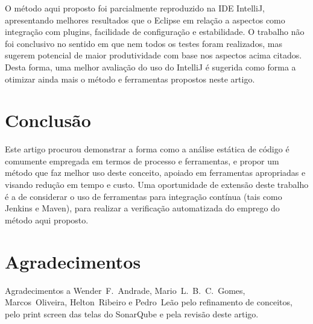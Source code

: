\documentclass[12pt,journal,compsoc]{IEEEtran}
\begin{document}
O método aqui proposto foi parcialmente reproduzido na IDE IntelliJ, apresentando melhores resultados que o Eclipse em relação a aspectos como integração com plugins, facilidade de configuração e estabilidade. O trabalho não foi conclusivo no sentido em que nem todos os testes foram realizados, mas sugerem potencial de maior produtividade com base nos aspectos acima citados. Desta forma, uma melhor avaliação do uso do IntelliJ é sugerida como forma a otimizar ainda mais o método e ferramentas propostos neste artigo.


\section{Conclusão}

Este artigo procurou demonstrar a forma como a análise estática de código é comumente empregada em termos de processo e ferramentas, e propor um método que faz melhor uso deste conceito, apoiado em  ferramentas apropriadas e visando redução em tempo e custo. Uma oportunidade de extensão deste trabalho é a de considerar o uso de ferramentas para integração contínua (tais como Jenkins\cite{jenkins} e Maven\cite{maven}), para realizar a verificação automatizada do emprego do método aqui proposto.

\section*{Agradecimentos}

Agradecimentos a Wender~F.~Andrade, Mario~L.~B.~C.~Gomes, Marcos~Oliveira, Helton~Ribeiro e Pedro~Leão pelo refinamento de conceitos, pelo print screen das telas do SonarQube e pela revisão deste artigo.




\end{document}
